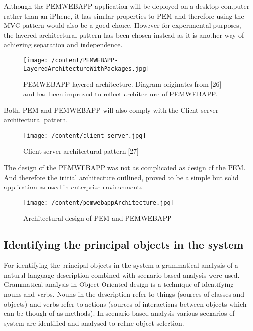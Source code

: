\documentclass[12pt, a4paper]{report}   %
\begin{document}
\begin{enumerate}
Although the PEMWEBAPP application will be deployed on a desktop computer rather than an iPhone, it has similar properties to PEM and therefore using the MVC pattern would also be a good choice. However for experimental purposes, the layered architectural pattern has been chosen instead as it is another way of achieving separation and independence.\\


\begin{figure}[H]
  \centering
	\texttt{[image: /content/PEMWEBAPP-LayeredArchitectureWithPackages.jpg]}
	  \caption{PEMWEBAPP layered architecture. Diagram originates from [26] and has been improved to reflect architecture of PEMWEBAPP.}
\end{figure}
 
\clearpage
Both, PEM and PEMWEBAPP will also comply with the Client-server architectural pattern. \\
 
 
\begin{figure}[H]
  \centering
	\texttt{[image: /content/client\_server.jpg]}
	  \caption{Client-server architectural pattern [27]}
\end{figure}
 
 
The design of the PEMWEBAPP was not as complicated as design of the PEM. And therefore the initial architecture outlined, proved to be a simple but solid application as used in enterprise environments.


\begin{figure}[H]
\begin{sideways}
\begin{minipage}{19cm}
	\texttt{[image: /content/pemwebappArchitecture.jpg]}
	\caption{Architectural design of PEM and PEMWEBAPP}
\end{minipage}
\end{sideways}
\centering
\end{figure}
 

\clearpage
\subsection{Identifying the principal objects in the system}
For identifying the principal objects in the system a grammatical analysis of a natural language description combined with scenario-based analysis were used. Grammatical analysis in Object-Oriented design is a technique of identifying nouns and verbs. Nouns in the description refer to things (sources of classes and objects) and verbs refer to actions (sources of interactions between objects which can be though of as methods). In scenario-based analysis various scenarios of system are identified and analysed to refine object selection.\\ \\



\end{enumerate}
\end{document}
